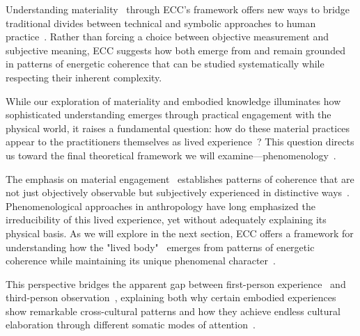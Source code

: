 Understanding materiality~ through ECC's framework offers new ways to bridge traditional divides between technical and symbolic approaches to human practice~\cite{ingold2013making,keane2003semiotics}. Rather than forcing a choice between objective measurement and subjective meaning, ECC suggests how both emerge from and remain grounded in patterns of energetic coherence that can be studied systematically while respecting their inherent complexity.

While our exploration of materiality and embodied knowledge illuminates how sophisticated understanding emerges through practical engagement with the physical world, it raises a fundamental question: how do these material practices appear to the practitioners themselves as lived experience~? This question directs us toward the final theoretical framework we will examine—phenomenology~.

The emphasis on material engagement~ establishes patterns of coherence that are not just objectively observable but subjectively experienced in distinctive ways~\cite{merleau2012phenomenology,jackson1996things}. Phenomenological approaches in anthropology have long emphasized the irreducibility of this lived experience, yet without adequately explaining its physical basis. As we will explore in the next section, ECC offers a framework for understanding how the "lived body"~ emerges from patterns of energetic coherence while maintaining its unique phenomenal character~.

This perspective bridges the apparent gap between first-person experience~ and third-person observation~\cite{csordas1994embodiment,desjarlais1992body}, explaining both why certain embodied experiences~ show remarkable cross-cultural patterns and how they achieve endless cultural elaboration through different somatic modes of attention~.
